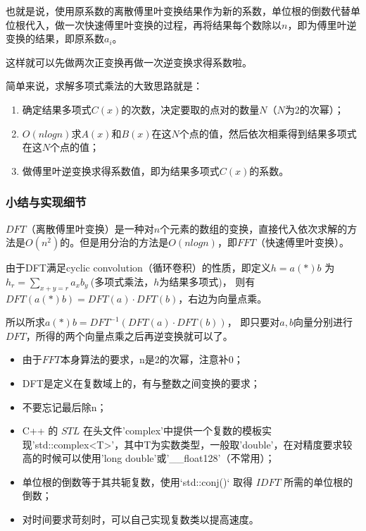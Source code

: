 也就是说，{\heiti 使用原系数的离散傅里叶变换结果作为新的系数，单位根的倒数代替单位根代入，做一次快速傅里叶变换的过程，再将结果每个数除以$n$}，即为傅里叶逆变换的结果，即原系数$a_i$。

这样就可以先做两次正变换再做一次逆变换求得系数啦。

简单来说，求解多项式乘法的大致思路就是：

\begin{enumerate}
\item 确定结果多项式$C(x)$的次数，决定要取的点对的数量$N$（$N$为2的次幂）；
\item $O(nlogn)$求$A(x)$和$B(x)$在这$N$个点的值，然后依次相乘得到结果多项式在这$N$个点的值；  
\item 做傅里叶逆变换求得系数值，即为结果多项式$C(x)$的系数。
\end{enumerate}

\subsubsection{小结与实现细节}
$DFT$（离散傅里叶变换）是一种对$n$个元素的数组的变换，直接代入依次求解的方法是$O(n^2)$的。但是用分治的方法是$O(nlogn)$，即$FFT$（快速傅里叶变换）。

由于DFT满足{\heiti cyclic convolution（循环卷积）}的性质，即定义$h=a (*) b$  为$h_r=\sum_{x+y=r}a_xb_y\ $(多项式乘法，$h$为结果多项式)，
则有$DFT(a (*) b)=DFT(a)\cdot DFT(b)$，右边为向量点乘。

所以所求$a (*) b=DFT^{-1}(DFT(a)\cdot DFT(b))$，
即只要对$a,b$向量分别进行$DFT$，所得的两个向量点乘之后再逆变换就可以了。

\begin{note}
\begin{itemize}
\item 由于$FFT$本身算法的要求，n是2的次幂，注意补0；
\item DFT是定义在复数域上的，有与整数之间变换的要求；
\item 不要忘记最后除n；
\item C++ 的 $STL$ 在头文件'complex'中提供一个复数的模板实现'std::complex<T>'，其中T为实数类型，一般取'double'，在对精度要求较高的时候可以使用'long double'或'\_\_float128'（不常用）；
\item 单位根的倒数等于其共轭复数，使用`std::conj()` 取得 $IDFT$ 所需的单位根的倒数；
\item 对时间要求苛刻时，可以自己实现复数类以提高速度。
\end{itemize}
\end{note}


